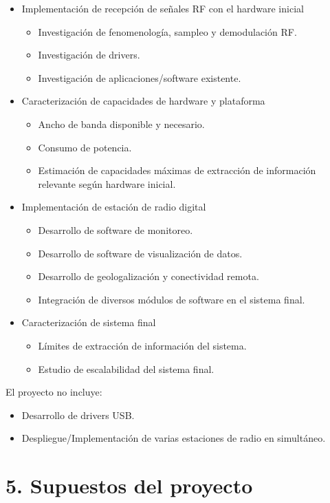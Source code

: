 \documentclass[
11pt, %
codirector, %
]{charter}
\begin{document}
\begin{itemize}
	\item Implementación de recepción de señales RF con el hardware inicial
		\begin{itemize}
		\item Investigación de fenomenología, sampleo y demodulación RF.
		\item Investigación de drivers.
		\item Investigación de aplicaciones/software existente.
		\end{itemize}
	\item Caracterización de capacidades de hardware y plataforma
		\begin{itemize}
		\item Ancho de banda disponible y necesario.
		\item Consumo de potencia.
		\item Estimación de capacidades máximas de extracción de información relevante según hardware inicial.
		\end{itemize}
	\item Implementación de estación de radio digital
		\begin{itemize}
		\item Desarrollo de software de monitoreo.
		\item Desarrollo de software de visualización de datos.
		\item Desarrollo de geologalización y conectividad remota.
		\item Integración de diversos módulos de software en el sistema final.
		\end{itemize}
	\item Caracterización de sistema final
		\begin{itemize}
		\item Límites de extracción de información del sistema.
		\item Estudio de escalabilidad del sistema final.
		\end{itemize}
\end{itemize}

El proyecto no incluye:
\begin{itemize}
	\item Desarrollo de drivers USB.
	\item Despliegue/Implementación de varias estaciones de radio en simultáneo.
\end{itemize}



\section{5. Supuestos del proyecto}
\label{sec:supuestos}
\end{document}
